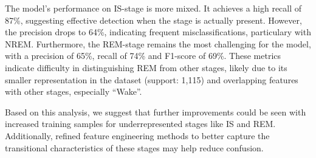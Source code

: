 \documentclass{article}
\begin{document}
\begin{multicols}{2}
The model's performance on IS-stage is more mixed. It achieves a high recall of 87\%, suggesting effective detection when the stage is actually present. However, the precision drops to 64\%, indicating frequent misclassifications, particulary with NREM. Furthermore, the REM-stage remains the most challenging for the model, with a precision of 65\%, recall of 74\% and F1-score of 69\%. These metrics indicate difficulty in distinguishing REM from other stages, likely due to its smaller representation in the dataset (support: 1,115) and overlapping features with other stages, especially ``Wake''.

Based on this analysis, we suggest that further improvements could be seen with increased training samples for underrepresented stages like IS and REM. Additionally, refined feature engineering methods to better capture the transitional characteristics of these stages may help reduce confusion. 

\end{multicols}
\end{document}
